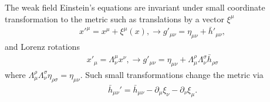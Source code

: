 The weak field Einstein's equations are invariant under small coordinate transformation to the metric such as translations by a vector $\xi^{\mu}$ 
\begin{align}
    x'^{\mu} = x^{\mu} + \xi^{\mu}(x), \longrightarrow g'_{\mu\nu} = \eta_{\mu\nu} + \bar{h}'_{\mu\nu},
\end{align}
and Lorenz rotations 
\begin{align}
    x'_{\mu} = \Lambda^{\mu}_{\nu}x^{\nu}, \longrightarrow g'_{\mu\nu} = \eta_{\mu\nu} + \Lambda_{\mu}^{\rho}\Lambda_{\nu}^{\sigma}\bar{h}_{\rho\sigma}
\end{align}
where $\Lambda_{\mu}^{\rho}\Lambda_{\nu}^{\sigma}\eta_{\rho\sigma} = \eta_{\mu\nu}$. Such small transformations change the metric via
\begin{align}
    \bar{h}_{\mu\nu}' = \bar{h}_{\mu\nu} - \partial_{\mu}\xi_{\nu} - \partial_{\nu}\xi_{\mu}.
\end{align}

